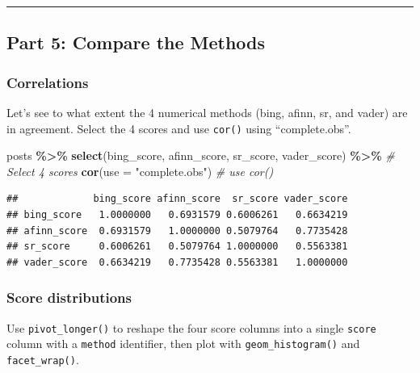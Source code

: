 \documentclass[
]{article}
\newenvironment{Shaded}{\begin{snugshade}}{\end{snugshade}}
\newcommand{\AttributeTok}[1]{\textcolor[rgb]{0.13,0.29,0.53}{#1}}
\newcommand{\CommentTok}[1]{\textcolor[rgb]{0.56,0.35,0.01}{\textit{#1}}}
\newcommand{\FunctionTok}[1]{\textcolor[rgb]{0.13,0.29,0.53}{\textbf{#1}}}
\newcommand{\NormalTok}[1]{#1}
\newcommand{\SpecialCharTok}[1]{\textcolor[rgb]{0.81,0.36,0.00}{\textbf{#1}}}
\newcommand{\StringTok}[1]{\textcolor[rgb]{0.31,0.60,0.02}{#1}}
\begin{document}
\begin{center}\rule{0.5\linewidth}{0.5pt}\end{center}

\subsection{Part 5: Compare the
Methods}\label{part-5-compare-the-methods}

\subsubsection{Correlations}\label{correlations}

Let's see to what extent the 4 numerical methods (bing, afinn, sr, and
vader) are in agreement. Select the 4 scores and use \texttt{cor()}
using ``complete.obs''.

\begin{Shaded}
\begin{Highlighting}[]
\NormalTok{posts }\SpecialCharTok{\%\textgreater{}\%} 
  \FunctionTok{select}\NormalTok{(bing\_score, afinn\_score, sr\_score, vader\_score) }\SpecialCharTok{\%\textgreater{}\%} \CommentTok{\# Select 4 scores }
  \FunctionTok{cor}\NormalTok{(}\AttributeTok{use =} \StringTok{"complete.obs"}\NormalTok{) }\CommentTok{\# use cor()}
\end{Highlighting}
\end{Shaded}

\begin{verbatim}
##             bing_score afinn_score  sr_score vader_score
## bing_score   1.0000000   0.6931579 0.6006261   0.6634219
## afinn_score  0.6931579   1.0000000 0.5079764   0.7735428
## sr_score     0.6006261   0.5079764 1.0000000   0.5563381
## vader_score  0.6634219   0.7735428 0.5563381   1.0000000
\end{verbatim}

\subsubsection{Score distributions}\label{score-distributions}

Use \texttt{pivot\_longer()} to reshape the four score columns into a
single \texttt{score} column with a \texttt{method} identifier, then
plot with \texttt{geom\_histogram()} and \texttt{facet\_wrap()}.
\end{document}
